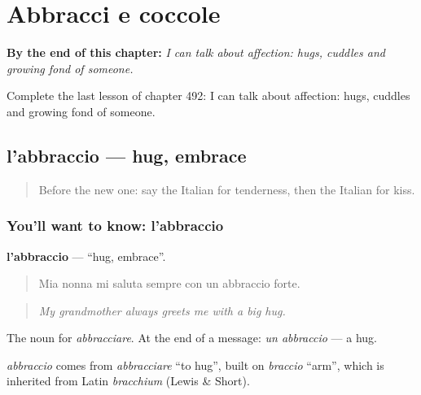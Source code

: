 
\chapter{Abbracci e coccole}
\label{ch:it-abbracci-e-coccole}

\begin{chapteropening}
\textbf{By the end of this chapter:} \emph{I can talk about affection: hugs, cuddles and growing fond of someone.}

Complete the last lesson of chapter 492: I can talk about affection: hugs, cuddles and growing fond of someone.
\end{chapteropening}

\section[l'abbraccio]{l'abbraccio — hug, embrace}

\label{lesson:IT-C492-abbraccio}



\begin{quote}
Before the new one: say the Italian for tenderness, then the Italian for kiss.
\end{quote}

\subsection*{You'll want to know: l'abbraccio}
\textbf{l'abbraccio} — \textquotedblleft{}hug, embrace\textquotedblright{}.

\begin{quote}
Mia nonna mi saluta sempre con un abbraccio forte.
\end{quote}

\begin{quote}
\emph{My grandmother always greets me with a big hug.}
\end{quote}

The noun for \emph{abbracciare}. At the end of a message: \emph{un abbraccio} — a hug.

\begin{cousinweb}
\emph{abbraccio} comes from \emph{abbracciare} \textquotedblleft{}to hug\textquotedblright{}, built on \emph{braccio} \textquotedblleft{}arm\textquotedblright{}, which is inherited from Latin \emph{bracchium} (Lewis \& Short).
\end{cousinweb}

